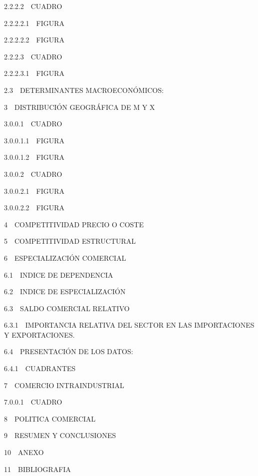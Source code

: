 \documentclass[11pt]{article}
\begin{document}
{2.2.2.2~~}CUADRO

{2.2.2.2.1~~}FIGURA

{2.2.2.2.2~~}FIGURA

{2.2.2.3~~}CUADRO

{2.2.2.3.1~~}FIGURA

{2.3~~}DETERMINANTES MACROECONÓMICOS:

{3~~}DISTRIBUCIÓN GEOGRÁFICA DE M Y X

{3.0.0.1~~}CUADRO

{3.0.0.1.1~~}FIGURA

{3.0.0.1.2~~}FIGURA

{3.0.0.2~~}CUADRO

{3.0.0.2.1~~}FIGURA

{3.0.0.2.2~~}FIGURA

{4~~}COMPETITIVIDAD PRECIO O COSTE

{5~~}COMPETITIVIDAD ESTRUCTURAL

{6~~}ESPECIALIZACIÓN COMERCIAL

{6.1~~}INDICE DE DEPENDENCIA

{6.2~~}INDICE DE ESPECIALIZACIÓN

{6.3~~}SALDO COMERCIAL RELATIVO

{6.3.1~~}IMPORTANCIA RELATIVA DEL SECTOR EN LAS IMPORTACIONES Y
EXPORTACIONES.

{6.4~~}PRESENTACIÓN DE LOS DATOS:

{6.4.1~~}CUADRANTES

{7~~}{COMERCIO INTRAINDUSTRIAL}

{7.0.0.1~~}CUADRO

{8~~}POLITICA COMERCIAL

{9~~}RESUMEN Y CONCLUSIONES

{10~~}ANEXO

{11~~}BIBLIOGRAFIA
\end{document}
